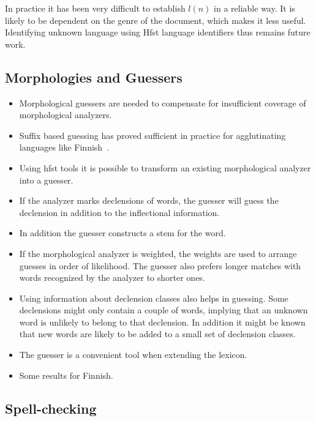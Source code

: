 \documentclass{llncs}
\begin{document}
In practice it has been very difficult to establish $l(n)$ in a
reliable way. It is likely to be dependent on the genre of the
document, which makes it less useful. Identifying unknown language
using Hfst language identifiers thus remains future work.

\subsection{Morphologies and Guessers}
\label{sec: morph-guessers}
\begin{itemize}
\item Morphological guessers are needed to compensate for insufficient
  coverage of morphological analyzers.
\item Suffix based guessing has proved sufficient in practice for
  agglutinating languages like Finnish~\cite{linden/2009/nodalida}.
\item Using hfst tools it is possible to transform an existing morphological analyzer into a guesser. 
\item If the analyzer marks declensions of words, the guesser will
  guess the declension in addition to the inflectional information.
\item In addition the guesser constructs a stem for the word.
\item If the morphological analyzer is weighted, the weights are used
  to arrange guesses in order of likelihood. The guesser also prefers
  longer matches with words recognized by the analyzer to shorter
  ones.
\item Using information about declension classes also helps in
  guessing. Some declensions might only contain a couple of words,
  implying that an unknown word is unlikely to belong to that
  declension. In addition it might be known that new words are likely
  to be added to a small set of declension classes.
\item The guesser is a convenient tool when extending the lexicon.
\item Some results for Finnish.
\end{itemize}

\subsection{Spell-checking}
\end{document}
